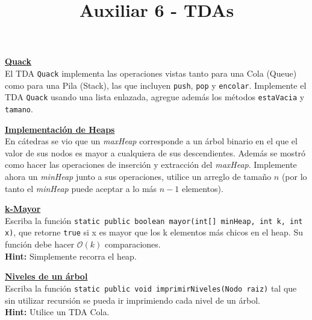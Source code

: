 \documentclass[dcc,uchile,sol]{fcfmcourse}
\title{Auxiliar 6 - TDAs}
\newcommand{\ptitle}[1]{\underline{\textbf{#1}}}
\begin{document}
\maketitle

\vspace{-1ex}


\begin{problems}
\problem \ptitle{Quack}\\
El TDA \texttt{Quack} implementa las operaciones vistas tanto para una Cola (Queue) como para una Pila (Stack), las que incluyen \texttt{push}, \texttt{pop} y \texttt{encolar}. Implemente el TDA \texttt{Quack} usando una lista enlazada, agregue además los métodos \texttt{estaVacia} y \texttt{tamano}.

\problem \ptitle{Implementación de Heaps}\\
En cátedras se vio que un \textit{maxHeap} corresponde a un árbol binario en el que el valor de sus nodos es mayor a cualquiera de sus descendientes. Además se mostró como hacer las operaciones de inserción y extracción del \textit{maxHeap}. Implemente ahora un \textit{minHeap} junto a sus operaciones, utilice un arreglo de tamaño $n$ (por lo tanto el \textit{minHeap} puede aceptar a lo más $n-1$ elementos).

\problem \ptitle{k-Mayor}\\
Escriba la función \texttt{static public boolean mayor(int[] minHeap, int k, int x)}, que retorne \texttt{true} si x es mayor que los k elementos m\'as chicos en el heap. Su función debe hacer $\mathcal{O}(k)$ comparaciones.\\
\textbf{Hint:} Simplemente recorra el heap.

\problem \ptitle{Niveles de un árbol}\\
Escriba la función \texttt{static public void imprimirNiveles(Nodo raiz)} tal que sin utilizar recursión se pueda ir imprimiendo cada nivel de un árbol.\\
\textbf{Hint:} Utilice un TDA Cola.

\end{problems}
\end{document}
